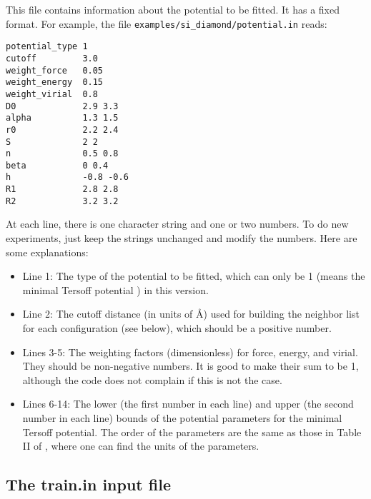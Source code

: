 \documentclass[12pt,a4paper]{report}
\begin{document}
This file contains information about the potential to be fitted. It has a fixed format. For example, the file \verb"examples/si_diamond/potential.in" reads:
\begin{verbatim}
potential_type 1
cutoff         3.0
weight_force   0.05
weight_energy  0.15
weight_virial  0.8
D0             2.9 3.3
alpha          1.3 1.5
r0             2.2 2.4
S              2 2
n              0.5 0.8
beta           0 0.4
h              -0.8 -0.6
R1             2.8 2.8
R2             3.2 3.2
\end{verbatim}
At each line, there is one character string and one or two numbers. To do new experiments, just keep the strings unchanged and modify the numbers. Here are some explanations:
\begin{itemize}
\item Line 1: The type of the potential to be fitted, which can only be 1  (means the minimal Tersoff potential \cite{fan2019arxiv}) in this version.
\item Line 2: The cutoff distance (in units of \AA) used for building the neighbor list for each configuration (see below), which should be a positive number.
\item Lines 3-5: The weighting factors (dimensionless) for force, energy, and virial. They should be non-negative numbers. It is good to make their sum to be 1, although the code does not complain if this is not the case.
\item Lines 6-14: The lower (the first number in each line) and upper (the second number in each line) bounds of the potential parameters for the minimal Tersoff potential. The order of the parameters are the same as those in Table II of \cite{fan2019arxiv}, where one can find the units of the parameters. 
\end{itemize}

\subsection{The train.in input file}
\end{document}
